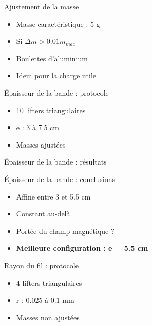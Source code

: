 \documentclass{beamer}
\begin{document}
		\begin{frame}{Ajustement de la masse}
			\begin{itemize}
				\item Masse caractéristique : 5 g
				\item Si $\Delta m > 0.01m_{max}$
				\item Boulettes d'aluminium
				\item Idem pour la charge utile
			\end{itemize}
		\end{frame}
	
		\begin{frame}{Épaisseur de la bande : protocole}
			\begin{itemize}
				\item 10 lifters triangulaires
				\item e : 3 à 7.5 cm
				\item Masses ajustées
			\end{itemize}
		\end{frame}
	
		\begin{frame}{Épaisseur de la bande : résultats}
		\end{frame}
	
		\begin{frame}{Épaisseur de la bande : conclusions}
			\begin{itemize}
				\item Affine entre 3 et 5.5 cm
				\item Constant au-delà
				\item Portée du champ magnétique ?
				\item \textbf{Meilleure configuration : e = 5.5 cm}
			\end{itemize}
		\end{frame}
	
		\begin{frame}{Rayon du fil : protocole}
			\begin{itemize}
				\item 4 lifters triangulaires
				\item r : 0.025 à 0.1 mm
				\item Masses non ajustées
			\end{itemize}
		\end{frame}
	
\end{document}
